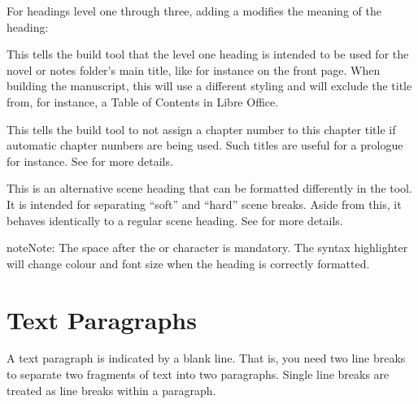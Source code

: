 \documentclass[a4paper,11pt,english]{sphinxmanual}
\begin{document}
\sphinxAtStartPar
For headings level one through three, adding a \sphinxcode{\sphinxupquote{!}} modifies the meaning of the heading:
\begin{description}
\sphinxAtStartPar
This tells the build tool that the level one heading is intended to be used for the novel or
notes folder’s main title, like for instance on the front page. When building the manuscript,
this will use a different styling and will exclude the title from, for instance, a Table of
Contents in Libre Office.

\sphinxAtStartPar
This tells the build tool to not assign a chapter number to this chapter title if automatic
chapter numbers are being used. Such titles are useful for a prologue for instance. See
{\hyperref[\detokenize{project_structure:a-struct-heads-unnum}]{}} for more details.

\sphinxAtStartPar
This is an alternative scene heading that can be formatted differently in the  tool. It is intended for separating “soft” and “hard” scene breaks. Aside from this, it
behaves identically to a regular scene heading. See {\hyperref[\detokenize{project_structure:a-struct-heads-scenes}]{}} for more
details.

\end{description}

\begin{sphinxadmonition}{note}{Note:}
\sphinxAtStartPar
The space after the \sphinxcode{\sphinxupquote{\#}} or \sphinxcode{\sphinxupquote{!}} character is mandatory. The syntax highlighter will change
colour and font size when the heading is correctly formatted.
\end{sphinxadmonition}


\section{Text Paragraphs}
\label{\detokenize{usage_format:text-paragraphs}}\label{\detokenize{usage_format:a-fmt-text}}
\sphinxAtStartPar
A text paragraph is indicated by a blank line. That is, you need two line breaks to separate two
fragments of text into two paragraphs. Single line breaks are treated as line breaks within a
paragraph.
\end{document}
